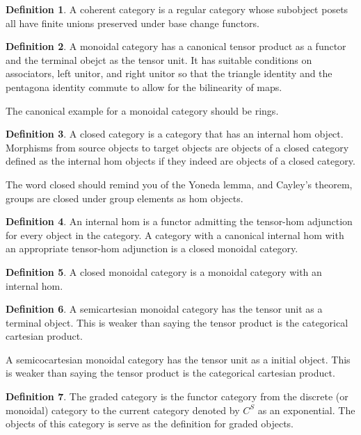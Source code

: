 \documentclass[10pt]{article}
\theoremstyle{plain}%
\theoremstyle{definition}
\newtheorem{definition}{Definition}[section]
\theoremstyle{remark}
\begin{document}
\begin{definition}
    A coherent category is a regular category whose subobject posets all have finite unions preserved under base change functors.
\end{definition}

\begin{definition}
    A monoidal category has a canonical tensor product as a functor and the terminal obejct as the tensor unit. It has suitable conditions on associators, left unitor, and right unitor so that the triangle identity and the pentagona identity commute to allow for the bilinearity of maps.
\end{definition}

The canonical example for a monoidal category should be rings.

\begin{definition}
    A closed category is a category that has an internal hom object. Morphisms from source objects to target objects are objects of a closed category defined as the internal hom objects if they indeed are objects of a closed category.
\end{definition}

The word closed should remind you of the Yoneda lemma, and Cayley's theorem, groups are closed under group elements as hom objects.

\begin{definition}
    An internal hom is a functor admitting the tensor-hom adjunction for every object in the category. A category with a canonical internal hom with an appropriate tensor-hom adjunction is a closed monoidal category.
\end{definition}

\begin{definition}
    A closed monoidal category is a monoidal category with an internal hom.
\end{definition}

\begin{definition}
    A semicartesian monoidal category has the tensor unit as a terminal object. This is weaker than saying the tensor product is the categorical cartesian product.

    A semicocartesian monoidal category has the tensor unit as a initial object. This is weaker than saying the tensor product is the categorical cartesian product.
\end{definition}

\begin{definition}
    The graded category is the functor category from the discrete (or monoidal) category to the current category denoted by $C^S$ as an exponential. The objects of this category is serve as the definition for graded objects.
\end{definition}
\end{document}
